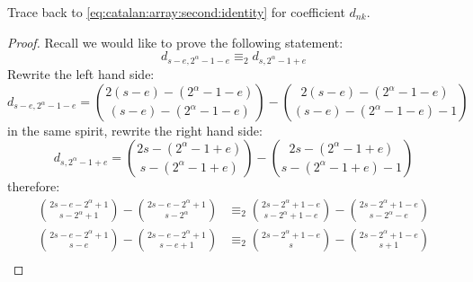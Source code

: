 Trace back to \autoref{eq:catalan:array:second:identity} for coefficient $d_{nk}$. 
\begin{proof}
Recall we would like to prove the following statement:
\begin{displaymath}
    d_{s-e,2^{{\alpha}}-1-e} \equiv_{2} d_{s,2^{{\alpha}}-1+e}
\end{displaymath}
Rewrite the left hand side:
\begin{displaymath}
    d_{s-e,2^{{\alpha}}-1-e}= {{2(s-e)-(2^{{\alpha}}-1-e)}\choose{(s-e)-(2^{{\alpha}}-1-e)}}
        - {{2(s-e)-(2^{{\alpha}}-1-e)}\choose{(s-e)-(2^{{\alpha}}-1-e)-1}}
\end{displaymath}
in the same spirit, rewrite the right hand side:
\begin{displaymath}
    d_{s,2^{{\alpha}}-1+e}={{2s-(2^{{\alpha}}-1+e)}\choose{s-(2^{{\alpha}}-1+e)}}
        - {{2s-(2^{{\alpha}}-1+e)}\choose{s-(2^{{\alpha}}-1+e)-1}}
\end{displaymath}
therefore:
\begin{displaymath}
    \begin{split}
        {{2s-e-2^{{\alpha}}+1}\choose{s-2^{{\alpha}}+1}}
            - {{2s-e-2^{{\alpha}}+1}\choose{s-2^{{\alpha}}}}
        &\equiv_{2}
        {{2s-2^{{\alpha}}+1-e}\choose{s-2^{{\alpha}}+1-e}}
            - {{2s-2^{{\alpha}}+1-e}\choose{s-2^{{\alpha}}-e}}\\
        {{2s-e-2^{{\alpha}}+1}\choose{s-e}}
            - {{2s-e-2^{{\alpha}}+1}\choose{s-e+1}}
        &\equiv_{2}
        {{2s-2^{{\alpha}}+1-e}\choose{s}}
            - {{2s-2^{{\alpha}}+1-e}\choose{s+1}}\\
    \end{split}
\end{displaymath}


\end{proof}
